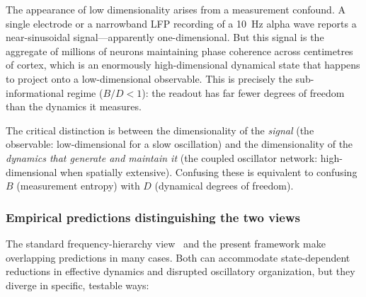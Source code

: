 \documentclass[12pt]{article}
\begin{document}
The appearance of low dimensionality arises from a measurement confound. A single
electrode or a narrowband LFP recording of a 10~Hz alpha wave reports a near-sinusoidal
signal---apparently one-dimensional. But this signal is the aggregate of millions of
neurons maintaining phase coherence across centimetres of cortex, which is an
enormously high-dimensional dynamical state that happens to project onto a
low-dimensional observable. This is precisely the sub-informational regime ($B/D < 1$):
the readout has far fewer degrees of freedom than the dynamics it measures.

The critical distinction is between the dimensionality of the \emph{signal}
(the observable: low-dimensional for a slow oscillation) and the dimensionality of the
\emph{dynamics that generate and maintain it} (the coupled oscillator network:
high-dimensional when spatially extensive). Confusing these is equivalent to
confusing $B$ (measurement entropy) with $D$ (dynamical degrees of freedom).

\subsubsection{Empirical predictions distinguishing the two views}

The standard frequency-hierarchy view~\cite{miller2018} and the present framework make
overlapping predictions in many cases. Both can accommodate state-dependent reductions in
effective dynamics and disrupted oscillatory organization, but they diverge in specific,
testable ways:
\end{document}
